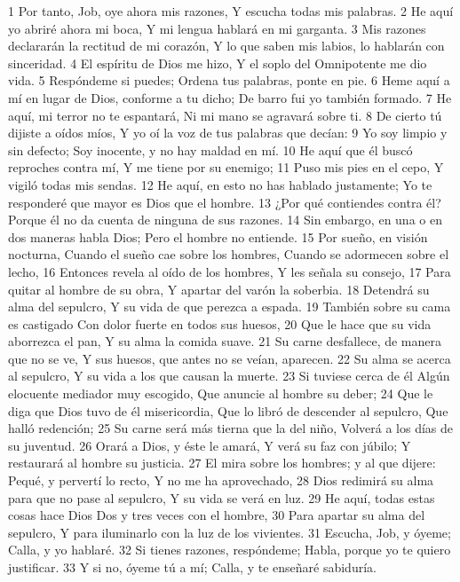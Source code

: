 1 Por tanto, Job, oye ahora mis razones,
Y escucha todas mis palabras.
2 He aquí yo abriré ahora mi boca,
Y mi lengua hablará en mi garganta.
3 Mis razones declararán la rectitud de mi corazón,
Y lo que saben mis labios, lo hablarán con sinceridad.
4 El espíritu de Dios me hizo,
Y el soplo del Omnipotente me dio vida.
5 Respóndeme si puedes;
Ordena tus palabras, ponte en pie.
6 Heme aquí a mí en lugar de Dios, conforme a tu dicho;
De barro fui yo también formado.
7 He aquí, mi terror no te espantará,
Ni mi mano se agravará sobre ti.
8 De cierto tú dijiste a oídos míos,
Y yo oí la voz de tus palabras que decían: 
9 Yo soy limpio y sin defecto;
Soy inocente, y no hay maldad en mí. 
10 He aquí que él buscó reproches contra mí,
Y me tiene por su enemigo;
11 Puso mis pies en el cepo,
Y vigiló todas mis sendas.
12 He aquí, en esto no has hablado justamente;
Yo te responderé que mayor es Dios que el hombre.
13 ¿Por qué contiendes contra él?
Porque él no da cuenta de ninguna de sus razones.
14 Sin embargo, en una o en dos maneras habla Dios;
Pero el hombre no entiende.
15 Por sueño, en visión nocturna,
Cuando el sueño cae sobre los hombres, 
Cuando se adormecen sobre el lecho, 
16 Entonces revela al oído de los hombres,
Y les señala su consejo,
17 Para quitar al hombre de su obra,
Y apartar del varón la soberbia.
18 Detendrá su alma del sepulcro,
Y su vida de que perezca a espada.
19 También sobre su cama es castigado
Con dolor fuerte en todos sus huesos,
20 Que le hace que su vida aborrezca el pan,
Y su alma la comida suave.
21 Su carne desfallece, de manera que no se ve,
Y sus huesos, que antes no se veían, aparecen.
22 Su alma se acerca al sepulcro,
Y su vida a los que causan la muerte.
23 Si tuviese cerca de él
Algún elocuente mediador muy escogido,
Que anuncie al hombre su deber;
24 Que le diga que Dios tuvo de él misericordia,
Que lo libró de descender al sepulcro,
Que halló redención;
25 Su carne será más tierna que la del niño,
Volverá a los días de su juventud.
26 Orará a Dios, y éste le amará,
Y verá su faz con júbilo;
Y restaurará al hombre su justicia.
27 El mira sobre los hombres; y al que dijere:
Pequé, y pervertí lo recto,
Y no me ha aprovechado,
28 Dios redimirá su alma para que no pase al sepulcro,
Y su vida se verá en luz.
29 He aquí, todas estas cosas hace Dios
Dos y tres veces con el hombre,
30 Para apartar su alma del sepulcro,
Y para iluminarlo con la luz de los vivientes.
31 Escucha, Job, y óyeme;
Calla, y yo hablaré.
32 Si tienes razones, respóndeme;
Habla, porque yo te quiero justificar.
33 Y si no, óyeme tú a mí;
Calla, y te enseñaré sabiduría. 

